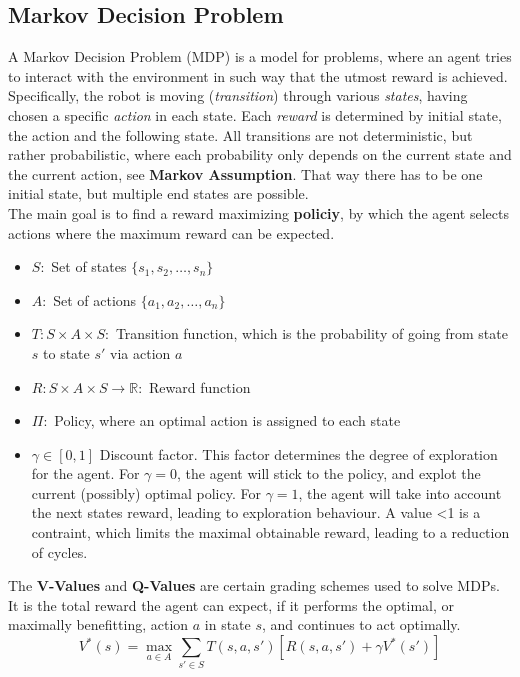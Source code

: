 \documentclass[a4paper]{article}
\begin{document}
	\subsection{Markov Decision Problem}
	A Markov Decision Problem (MDP) is a model for problems, where an agent tries to interact with the environment in such way that the utmost reward is achieved. Specifically, the robot is moving (\textit{transition}) through various \textit{states}, having chosen a specific \textit{action} in each state. Each \textit{reward} is determined by initial state, the action and the following state. 
	All transitions are not deterministic, but rather probabilistic, where each probability only depends on the current state and the current action, see \textbf{Markov Assumption}. That way there has to be one initial state, but multiple end states are possible.\\
	The main goal is to find a reward maximizing \textbf{policiy}, by which the agent selects actions where the maximum reward can be expected.\\
	\begin{itemize}
		\item $S:$ Set of states $\{s_1,s_2,\dots, s_n\}$
		\item $A:$ Set of actions $\{a_1,a_2,\dots, a_n\}$ 
		\item $T: S\times A \times S: $ Transition function, which is the probability of going from state $s$ to state $s'$ via action $a$
		\item $R: S\times A \times S \rightarrow \mathbb{R}: $ Reward function
		\item $\Pi:$ Policy, where an optimal action is assigned to each state
		\item $\gamma \in [0,1]$ Discount factor. This factor determines the degree of exploration for the agent. For $\gamma=0$, the agent will stick to the policy, and explot the current (possibly) optimal policy. For $\gamma=1$, the agent will take into account the next states reward, leading to exploration behaviour. A value <1 is a contraint, which limits the maximal obtainable reward, leading to a reduction of cycles.
	\end{itemize}
	The \textbf{V-Values} and \textbf{Q-Values} are certain grading schemes used to solve MDPs. It is the total reward the agent can expect, if it performs the optimal, or maximally benefitting, action $a$ in state $s$, and continues to act optimally.
	\begin{equation}\label{eq:vvalue}
		V^*(s) = \max_{a \in A} \sum_{s' \in S}^{} T(s,a,s')[R(s,a,s')+\gamma V^*(s')]
	\end{equation}
\end{document}

